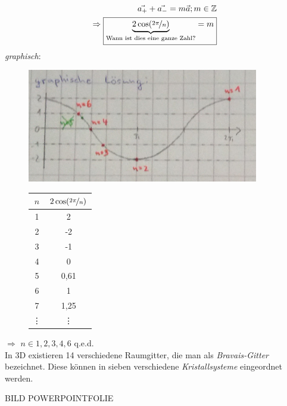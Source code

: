 \documentclass[paper=A4,12pt,pagesize,twoside,BCOR=8mm,ngerman]{scrartcl}
\begin{document}
			\begin{align*}
				\vec{a_+}+\vec{a_-} = m \vec{a}; m \in \mathbb{Z}\\
				\Rightarrow \boxed{\underbrace{2\cos 
				(\nicefrac{2\pi}{n})}_{\text{\normalfont Wann ist dies 
				eine ganze Zahl?}} = m}	
			\end{align*}
			\emph{graphisch}:
			\begin{figure}[H]
				\centering
				\begin{minipage}[c]{0.6\textwidth}
					\centering
					\includegraphics[width=0.9\textwidth]
					{pics/pic005.jpg}
				\end{minipage}	
				\begin{minipage}[c]{0.39\textwidth}
					\centering
					\begin{tabular}{cc}
						\toprule
						$n$ & $2 \cos (\nicefrac{2\pi}{n})$ \\
						\midrule
						1	&	2	\\
						2	&	-2	\\
						3	&	-1	\\
						4	&	0	\\
						5	&	0,61\\
						6	&	1	\\
						7	&	1,25\\
						\vdots & \vdots\\
						\bottomrule
					\end{tabular}
				\end{minipage}	
			\end{figure}
			$\Rightarrow$ $n \in {1, 2, 3, 4, 6}$ q.e.d.\\
			
			In 3D existieren 14 verschiedene Raumgitter, die man als 
			\emph{Bravais-Gitter} bezeichnet.
			Diese können in sieben verschiedene \emph{Kristallsysteme} 
			eingeordnet werden.
			
			BILD POWERPOINTFOLIE

\end{document}
